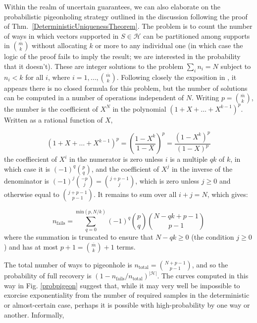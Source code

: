 Within the realm of uncertain guarantees, we can also elaborate on the probabilistic pigeonholing strategy outlined in the discussion following the proof of Thm.~\ref{DeterministicUniquenessTheorem}. The problem is to count the number of ways in which vectors supported in $S \in \mathcal{H}$ can be partitioned among supports in ${\overline m \choose k}$ without allocating $k$ or more to any individual one (in which case the logic of the proof fails to imply the result; we are interested in the probability that it doesn't). These are integer solutions to the problem $\sum_i n_i = N$ subject to $n_i < k$ for all $i$, where $i = 1, \ldots, {\overline m \choose k}$. Following closely the exposition in \cite{stackexchangeanswer}, it appears there is no closed formula for this problem, but the number of solutions can be computed in a number of operations independent of $N$. Writing $p = {\overline m \choose k}$, the number is the coefficient of $X^N$ in the polynomial $(1 + X + \ldots + X^{k-1})^p$. Written as a rational function of $X$, 

\begin{equation*}
(1 + X + \ldots + X^{k-1})^p = \left(\frac{1 - X^k}{1 - X} \right)^p = \frac{\left(1 - X^k \right)^p}{\left(1 - X\right)^p}
\end{equation*}
the coeffiecient of $X^i$ in the numerator is zero unless $i$ is a multiple $qk$ of $k$, in which case it is $(-1)^q{p \choose q}$, and the coefficient of $X^j$ in the inverse of the denominator is $(-1)^j {-p \choose j} = {j + p-1 \choose j}$, which is zero unless $j \geq 0$ and otherwise equal to ${j + p-1 \choose p-1}$. It remains to sum over all $i + j = N$, which gives:

\begin{equation*}
n_\text{fails} = \sum_{q=0}^{\text{min}(p, N/k)} (-1)^q {p \choose q} {N - qk + p - 1 \choose p - 1}
\end{equation*}
where the summation is truncated to ensure that $N - qk \geq 0$ (the condition $j \geq 0$) and has at most $p+1 = {\overline m \choose k} + 1$ terms.

The total number of ways to pigeonhole is $n_\text{total} = {N +p- 1 \choose p - 1}$, and so the probability of full recovery is $\left(1 - n_\text{fails} / n_\text{total} \right)^{|\mathcal{H}|}$. 
The curves computed in this way in Fig. \ref{probpigeon} suggest that, while it may very well be impossible to exorcise exponentiality from the number of required samples in the deterministic or almost-certain case, perhaps it is possible with high-probability by one way or another. Informally,

